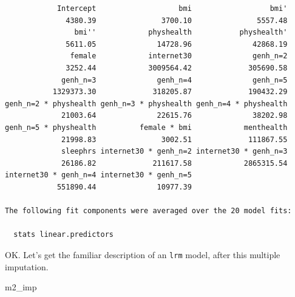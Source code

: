 \documentclass[]{book}
\newenvironment{Shaded}{\begin{snugshade}}{\end{snugshade}}
\newcommand{\NormalTok}[1]{#1}
\theoremstyle{definition}
\theoremstyle{definition}
\theoremstyle{definition}
\theoremstyle{remark}
\begin{document}
\begin{verbatim}
            Intercept                   bmi                  bmi' 
              4380.39               3700.10               5557.48 
                bmi''            physhealth           physhealth' 
              5611.05              14728.96              42868.19 
               female            internet30              genh_n=2 
              3252.44            3009564.42             305690.58 
             genh_n=3              genh_n=4              genh_n=5 
           1329373.30             318205.87             190432.29 
genh_n=2 * physhealth genh_n=3 * physhealth genh_n=4 * physhealth 
             21003.64              22615.76              38202.98 
genh_n=5 * physhealth          female * bmi            menthealth 
             21998.83               3002.51             111867.55 
             sleephrs internet30 * genh_n=2 internet30 * genh_n=3 
             26186.82             211617.58            2865315.54 
internet30 * genh_n=4 internet30 * genh_n=5 
            551890.44              10977.39 

The following fit components were averaged over the 20 model fits:

  stats linear.predictors 
\end{verbatim}

OK. Let's get the familiar description of an \texttt{lrm} model, after
this multiple imputation.

\begin{Shaded}
\begin{Highlighting}[]
\NormalTok{m2_imp}
\end{Highlighting}
\end{Shaded}
\end{document}
